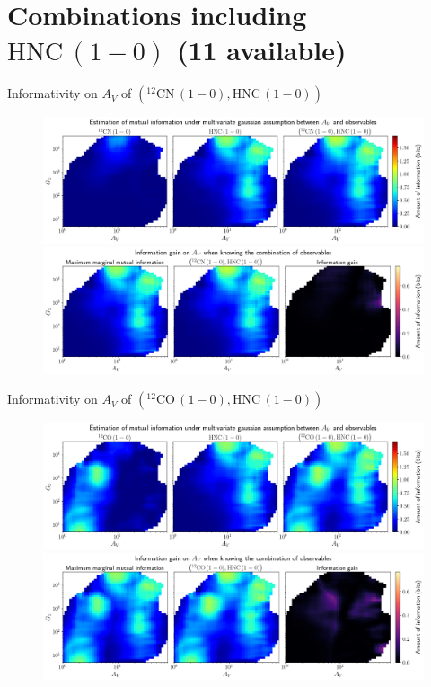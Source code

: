 \documentclass{beamer}
\begin{document}
\section{Combinations including $\mathrm{HNC\,(1-0)}$ (11 available)}

\begin{frame}{Informativity on $A_V$ of $\left(\mathrm{^{12}CN\,(1-0)},\mathrm{HNC\,(1-0)}\right)$}
    \begin{figure}
        \centering
        \includegraphics[width=0.95\linewidth]{../linearinfo/av__12cn10_hnc10_linearinfo.png}
        \vfill
        \includegraphics[width=0.95\linewidth]{../linearinfo/av__12cn10_hnc10_linearinfo_gain.png}
    \end{figure}
\end{frame}

\begin{frame}{Informativity on $A_V$ of $\left(\mathrm{^{12}CO\,(1-0)},\mathrm{HNC\,(1-0)}\right)$}
    \begin{figure}
        \centering
        \includegraphics[width=0.95\linewidth]{../linearinfo/av__12co10_hnc10_linearinfo.png}
        \vfill
        \includegraphics[width=0.95\linewidth]{../linearinfo/av__12co10_hnc10_linearinfo_gain.png}
    \end{figure}
\end{frame}
\end{document}
